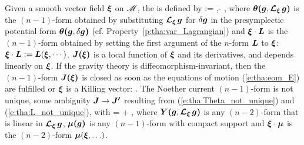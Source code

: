 \begin{prop}
\label{p:tha:Noether_current}
Given a smooth vector field $\bm{\xi}$ on $\mathscr{M}$,
the  is defined by \cite{Wald93,IyerW94}
\be \label{e:tha:def_Noether_current}
    \lld\w{\xi}\rld := \w{\theta}\lld{},\Lie{\xi}\rld - \w{\xi}\cdot{} ,
\ee
where $\bm{\theta}\textbf{(}\bm{g},\bm{\mathcal{L}}_{\bm{\xi}}\,\bm{g}\textbf{)}$ is the $(n-1)$-form obtained
by substituting $\bm{\mathcal{L}}_{\bm{\xi}}\,\bm{g}$ for $\delta\bm{g}$ in the
presymplectic potential form $\bm{\theta}\textbf{(}\bm{g},\delta\bm{g}\textbf{)}$
(cf. Property~\ref{p:tha:var_Lagrangian}) and $\bm{\xi}\cdot\bm{L}$
is the $(n-1)$-form obtained by setting the first argument of the $n$-form $\bm{L}$
to $\bm{\xi}$:  $\bm{\xi}\cdot\bm{L} := \bm{L}(\bm{\xi},\cdots)$.
$\bm{J}\textbf{(}\bm{\xi}\textbf{)}$ is a local function of $\bm{\xi}$ and its derivatives,
and depends linearly on $\bm{\xi}$.
If the gravity theory is diffeomorphism-invariant, then
the $(n-1)$-form $\bm{J}\textbf{(}\bm{\xi}\textbf{)}$ is closed as soon as the equations of motion (\ref{e:tha:eom_E}) are fulfilled  or $\bm{\xi}$ is a Killing vector:
\be \label{e:tha:J_closed}
    .
\ee
The Noether current $(n-1)$-form is not unique,
some ambiguity $\bm{J} \to \bm{J'}$ resulting from (\ref{e:tha:Theta_not_unique})
and (\ref{e:tha:L_not_unique}), with
\be \label{e:tha:J_not_unique}
     \lld\w{\xi}\rld =  \lld\w{\xi}\rld  + \dd {},
\ee
where $\bm{Y}\textbf{(}\bm{g},\bm{\mathcal{L}}_{\bm{\xi}}\,\bm{g}\textbf{)}$ is any $(n-2)$-form that is linear in $\bm{\mathcal{L}}_{\bm{\xi}}\,\bm{g}$,
$\bm{\mu}\textbf{(}\bm{g}\textbf{)}$ is any $(n-1)$-form with compact support and $\bm{\xi}\cdot\bm{\mu}$
is the $(n-2)$-form $\bm{\mu}(\bm{\xi},\ldots)$.
\end{prop}

